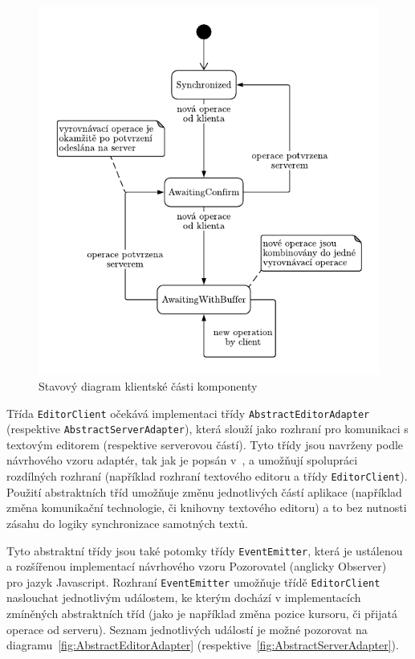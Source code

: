 \begin{figure}[ht!]
    \centering
    \includegraphics[width=\textwidth]{partials/navrh/editor/stavovyDiagram.pdf}
    \caption{Stavový diagram klientské části komponenty}\label{fig:stavovyDiagram}
\end{figure}

Třída \texttt{EditorClient} očekává implementaci třídy \texttt{AbstractEditorAdapter} (respektive \texttt{AbstractServerAdapter}), která slouží jako rozhraní pro komunikaci s textovým editorem (respektive serverovou částí).
Tyto třídy jsou navrženy podle návrhového vzoru adaptér, tak jak je popsán v~\cite[str.~135]{gof:patterns}, a umožňují spolupráci rozdílných rozhraní (například rozhraní textového editoru a třídy \texttt{EditorClient}).
Použití abstraktních tříd umožňuje změnu jednotlivých částí aplikace (například změna komunikační technologie, či knihovny textového editoru) a to bez nutnosti zásahu do logiky synchronizace samotných textů.

Tyto abstraktní třídy jsou také potomky třídy \texttt{EventEmitter}, která je ustálenou a rozšířenou implementací návrhového vzoru Pozorovatel (anglicky Observer)~\cite[str.~273]{gof:patterns} pro jazyk Javascript.
Rozhraní \texttt{EventEmitter} umožňuje třídě \texttt{EditorClient} naslouchat jednotlivým událostem, ke kterým dochází v implementacích zmíněných abstraktních tříd (jako je například změna pozice kursoru, či přijatá operace od serveru).
Seznam jednotlivých událostí je možné pozorovat na diagramu~\ref{fig:AbstractEditorAdapter} (respektive~\ref{fig:AbstractServerAdapter}).

